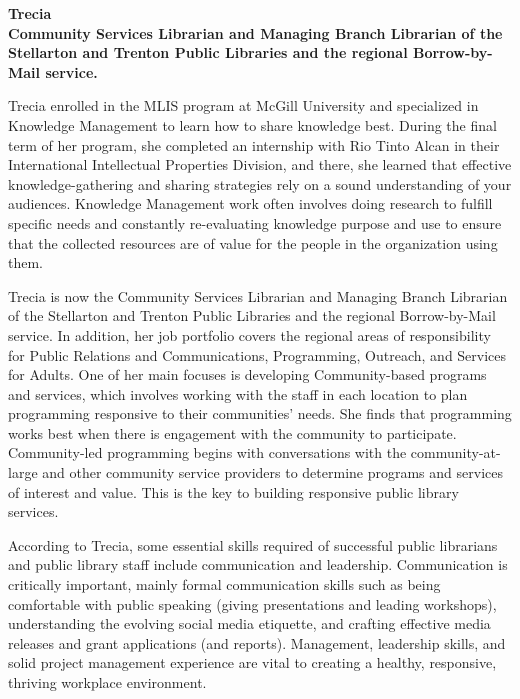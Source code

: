 \documentclass[
  letterpaper,
  DIV=11,
  numbers=noendperiod]{scrreprt}
\begin{document}
\begin{tcolorbox}[enhanced jigsaw, arc=.35mm, bottomrule=.15mm, bottomtitle=1mm, breakable, colback=white, colbacktitle=quarto-callout-tip-color!10!white, colframe=quarto-callout-tip-color-frame, coltitle=black, left=2mm, leftrule=.75mm, opacityback=0, opacitybacktitle=0.6, rightrule=.15mm, title=\textcolor{quarto-callout-tip-color}{\faLightbulb}\hspace{0.5em}{Meet a professional}, titlerule=0mm, toprule=.15mm, toptitle=1mm]

\textbf{Trecia\\
Community Services Librarian and Managing Branch Librarian of the
Stellarton and Trenton Public Libraries and the regional Borrow-by-Mail
service.}

Trecia enrolled in the MLIS program at McGill University and specialized
in Knowledge Management to learn how to share knowledge best. During the
final term of her program, she completed an internship with Rio Tinto
Alcan in their International Intellectual Properties Division, and
there, she learned that effective knowledge-gathering and sharing
strategies rely on a sound understanding of your audiences. Knowledge
Management work often involves doing research to fulfill specific needs
and constantly re-evaluating knowledge purpose and use to ensure that
the collected resources are of value for the people in the organization
using them.

Trecia is now the Community Services Librarian and Managing Branch
Librarian of the Stellarton and Trenton Public Libraries and the
regional Borrow-by-Mail service. In addition, her job portfolio covers
the regional areas of responsibility for Public Relations and
Communications, Programming, Outreach, and Services for Adults. One of
her main focuses is developing Community-based programs and services,
which involves working with the staff in each location to plan
programming responsive to their communities' needs. She finds that
programming works best when there is engagement with the community to
participate. Community-led programming begins with conversations with
the community-at-large and other community service providers to
determine programs and services of interest and value. This is the key
to building responsive public library services.

According to Trecia, some essential skills required of successful public
librarians and public library staff include communication and
leadership. Communication is critically important, mainly formal
communication skills such as being comfortable with public speaking
(giving presentations and leading workshops), understanding the evolving
social media etiquette, and crafting effective media releases and grant
applications (and reports). Management, leadership skills, and solid
project management experience are vital to creating a healthy,
responsive, thriving workplace environment.


\end{tcolorbox}
\end{document}
